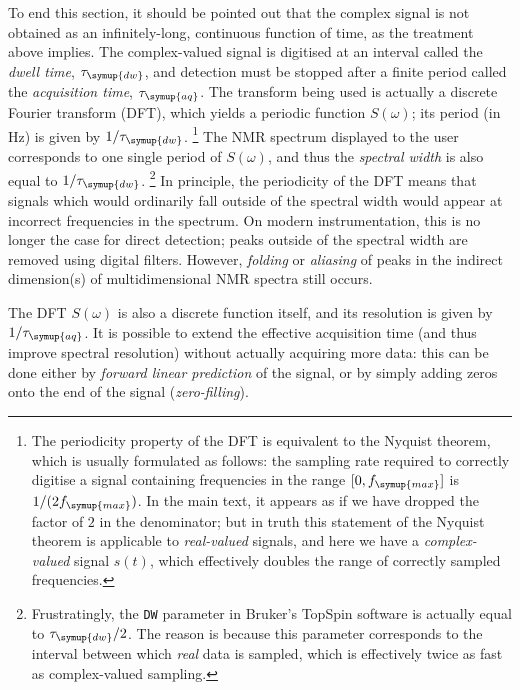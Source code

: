 To end this section, it should be pointed out that the complex signal is not obtained as an infinitely-long, continuous function of time, as the treatment above implies.
The complex-valued signal is digitised at an interval called the \textit{dwell time}, $\tau_{\symup{dw}}$, and detection must be stopped after a finite period called the \textit{acquisition time}, $\tau_{\symup{aq}}$.
The transform being used is actually a discrete Fourier transform (DFT), which yields a periodic function $S(\omega)$; its period (in Hz) is given by $1/\tau_{\symup{dw}}$.%
\footnote{The periodicity property of the DFT is equivalent to the Nyquist theorem, which is usually formulated as follows: the sampling rate required to correctly digitise a signal containing frequencies in the range $[0, f_{\symup{max}}]$ is $1/(2f_{\symup{max}})$. In the main text, it appears as if we have dropped the factor of $2$ in the denominator; but in truth this statement of the Nyquist theorem is applicable to \textit{real-valued} signals, and here we have a \textit{complex-valued} signal $s(t)$, which effectively doubles the range of correctly sampled frequencies.}
The NMR spectrum displayed to the user corresponds to one single period of $S(\omega)$, and thus the \textit{spectral width} is also equal to $1/\tau_{\symup{dw}}$.%
\footnote{Frustratingly, the \texttt{DW} parameter in Bruker's TopSpin software is actually equal to $\tau_{\symup{dw}}/2$. The reason is because this parameter corresponds to the interval between which \textit{real} data is sampled, which is effectively twice as fast as complex-valued sampling.}
In principle, the periodicity of the DFT means that signals which would ordinarily fall outside of the spectral width would appear at incorrect frequencies in the spectrum.\autocite{Turner1986JMR}
On modern instrumentation, this is no longer the case for direct detection; peaks outside of the spectral width are removed using digital filters.
However, \textit{folding} or \textit{aliasing} of peaks in the indirect dimension(s) of multidimensional NMR spectra still occurs.

The DFT $S(\omega)$ is also a discrete function itself, and its resolution is given by $1/\tau_{\symup{aq}}$.
It is possible to extend the effective acquisition time (and thus improve spectral resolution) without actually acquiring more data: this can be done either by \textit{forward linear prediction} of the signal, or by simply adding zeros onto the end of the signal (\textit{zero-filling}).
